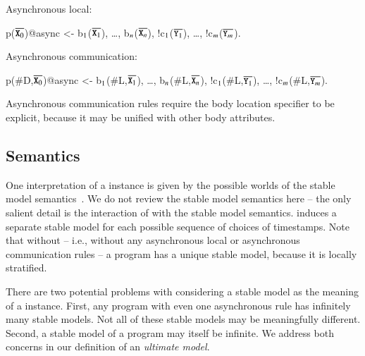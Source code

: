 Asynchronous local:

\begin{Dedalus}
p(\(\overline{\dedalus{X}\sb{0}}\))@async <- b\(\sb{1}\)(\(\overline{\dedalus{X}\sb{1}}\)), \ldots, b\(\sb{n}\)(\(\overline{\dedalus{X}\sb{n}}\)),
!c\(\sb{1}\)(\(\overline{\dedalus{Y}\sb{1}}\)), \ldots, !c\(\sb{m}\)(\(\overline{\dedalus{Y}\sb{m}}\)).
\end{Dedalus}

Asynchronous communication:

\begin{Dedalus}
p(#D,\(\overline{\dedalus{X}\sb{0}}\))@async <- b\(\sb{1}\)(#L,\(\overline{\dedalus{X}\sb{1}}\)), \ldots, b\(\sb{n}\)(#L,\(\overline{\dedalus{X}\sb{n}}\)),
!c\(\sb{1}\)(#L,\(\overline{\dedalus{Y}\sb{1}}\)), \ldots, !c\(\sb{m}\)(#L,\(\overline{\dedalus{Y}\sb{m}}\)).
\end{Dedalus}

Asynchronous communication rules require the body location specifier to be explicit, because it may be unified with other body attributes.





\subsection{Semantics}
One interpretation of a \lang instance is given by the possible worlds of the
stable model semantics~\cite{stable-model}.  We do not review the stable model
semantics here -- the only salient detail is the interaction of 
with the stable model semantics.   induces a separate stable
model for each possible sequence of choices  of timestamps.  Note that without
 -- i.e., without any asynchronous local or asynchronous
communication rules -- a \lang program has a unique stable model, because it is
locally stratified. 

There are two potential problems with considering a stable model as the meaning of a \lang instance.  
First, any program with even one asynchronous rule has infinitely many stable models.  
Not all of these stable models may be meaningfully different.  Second, a stable model of a \lang program may itself be infinite.  We address both concerns in our definition of an {\em ultimate model}.


